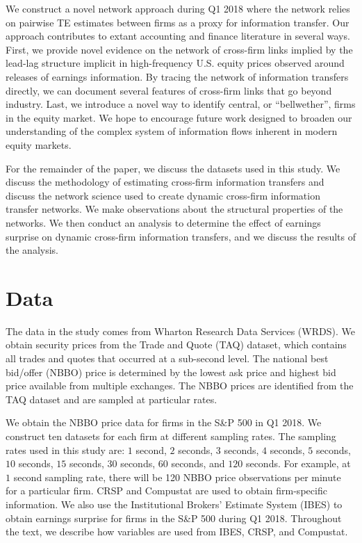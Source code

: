 We construct a novel network approach during Q1 2018 where the network relies on pairwise TE estimates between firms as a proxy for information transfer. Our approach contributes to extant accounting and finance literature in several ways.  First, we provide novel evidence on the network of cross-firm links implied by the lead-lag structure implicit in high-frequency U.S. equity prices observed around releases of earnings information.  By tracing the network of information transfers directly,  we can document several features of cross-firm links that go beyond industry.  Last, we introduce a novel way to identify central,  or “bellwether”,  firms in the equity market.  We hope to encourage future work designed to broaden our understanding of the complex system of information flows inherent in modern equity markets. 

For the remainder of the paper,  we discuss the datasets used in this study.   We discuss the methodology of estimating cross-firm information transfers and discuss the network science used to create dynamic cross-firm information transfer networks. We make observations about the structural properties of the networks.  We then conduct an analysis to determine the effect of earnings surprise on dynamic cross-firm information transfers, and we discuss the results of the analysis. 

\section{Data}
The data in the study comes from Wharton Research Data Services (WRDS). We obtain security prices from the Trade and Quote (TAQ) dataset, which contains all trades and quotes that occurred at a sub-second level. The national best bid/offer (NBBO) price is determined by the lowest ask price and highest bid price available from multiple exchanges. The NBBO prices are identified from the TAQ dataset and are sampled at particular rates. 

We obtain the NBBO price data for firms in the S\&P 500 in Q1 2018.  We construct ten datasets for each firm at different sampling rates. The sampling rates used in this study are: $1$ second,  $2$ seconds,  $3$ seconds,  $4$ seconds,  $5$ seconds, $10$ seconds,  $15$ seconds,  $30$ seconds,  $60$ seconds,  and $120$ seconds.  For example, at $1$ second sampling rate, there will be 120 NBBO price observations per minute for a particular firm.  CRSP and Compustat are used to obtain firm-specific information.  We also use the Institutional Brokers' Estimate System (IBES) to obtain earnings surprise for firms in the S\&P 500 during Q1 2018.  Throughout the text, we describe how variables are used from IBES, CRSP, and Compustat. 

